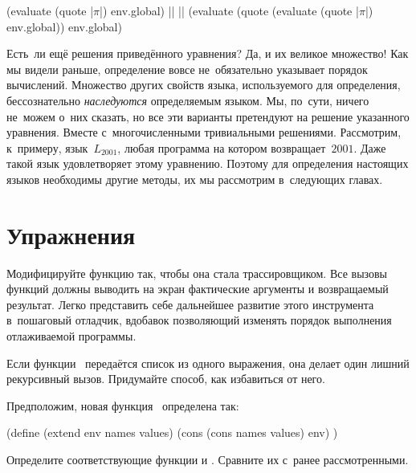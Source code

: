 \begin{code:lisp}
(evaluate (quote |$\pi$|) env.global) |\eq|
  |\eq| (evaluate (quote (evaluate (quote |$\pi$|) env.global)) env.global)
\end{code:lisp}

Есть~ли ещё решения приведённого уравнения? Да, и их великое множество! Как мы
видели раньше, определение  вовсе не~обязательно указывает порядок
вычислений. Множество других свойств языка, используемого для определения,
бессознательно \emph{наследуются} определяемым языком. Мы, по~сути, ничего
не~можем о~них сказать, но все эти варианты претендуют на решение указанного
уравнения. Вместе с~многочисленными тривиальными решениями. Рассмотрим,
к~примеру, язык~$L_{2001}$, любая программа на котором возвращает~$2001$. Даже
такой язык удовлетворяет этому уравнению. Поэтому для определения настоящих
языков необходимы другие методы, их мы рассмотрим в~следующих главах.


\section{Упражнения}\label{basics/sect:exercises}

\begin{exercise}\label{basics/ex:tracer}
Модифицируйте функцию  так, чтобы она стала трассировщиком. Все
вызовы функций должны выводить на экран фактические аргументы и возвращаемый
результат. Легко представить себе дальнейшее развитие этого инструмента
в~пошаговый отладчик, вдобавок позволяющий изменять порядок выполнения
отлаживаемой программы.
\end{exercise}

\begin{exercise}\label{basics/ex:excess-recursion}
Если функции~ передаётся список из одного выражения, она делает
один лишний рекурсивный вызов. Придумайте способ, как избавиться от него.
\end{exercise}

\begin{exercise}\label{basics/ex:new-extend}
Предположим, новая функция~ определена так:

\begin{code:lisp}
(define (extend env names values)
  (cons (cons names values) env) )
\end{code:lisp}

Определите соответствующие функции  и . Сравните их
с~ранее рассмотренными.
\end{exercise}

